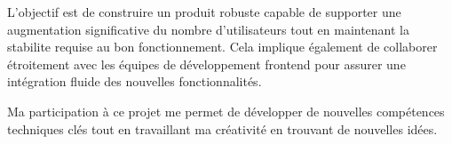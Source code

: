 L'objectif est de construire un produit robuste capable de supporter une
augmentation significative du nombre d'utilisateurs tout en maintenant la
stabilite requise au bon fonctionnement. Cela implique également de collaborer
étroitement avec les équipes de développement frontend pour assurer une
intégration fluide des nouvelles fonctionnalités.

\begin{comment}
SUPRIMER ?
\end{comment}
Ma participation à ce projet me permet de développer de nouvelles compétences
techniques clés tout en travaillant ma créativité en trouvant de nouvelles
idées.
